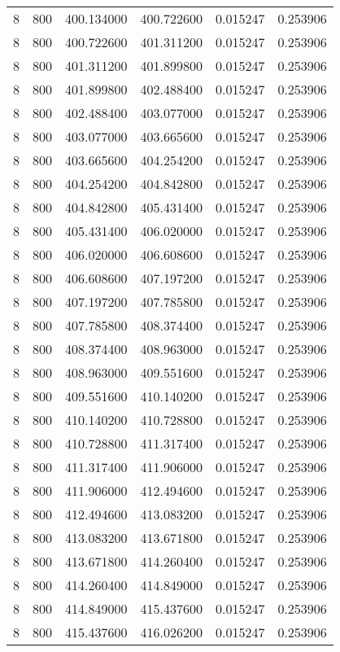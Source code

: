 \begin{longtable}{rrrrrr}
8 & 800 & 400.134000 & 400.722600 & 0.015247 & 0.253906 \\
8 & 800 & 400.722600 & 401.311200 & 0.015247 & 0.253906 \\
8 & 800 & 401.311200 & 401.899800 & 0.015247 & 0.253906 \\
8 & 800 & 401.899800 & 402.488400 & 0.015247 & 0.253906 \\
8 & 800 & 402.488400 & 403.077000 & 0.015247 & 0.253906 \\
8 & 800 & 403.077000 & 403.665600 & 0.015247 & 0.253906 \\
8 & 800 & 403.665600 & 404.254200 & 0.015247 & 0.253906 \\
8 & 800 & 404.254200 & 404.842800 & 0.015247 & 0.253906 \\
8 & 800 & 404.842800 & 405.431400 & 0.015247 & 0.253906 \\
8 & 800 & 405.431400 & 406.020000 & 0.015247 & 0.253906 \\
8 & 800 & 406.020000 & 406.608600 & 0.015247 & 0.253906 \\
8 & 800 & 406.608600 & 407.197200 & 0.015247 & 0.253906 \\
8 & 800 & 407.197200 & 407.785800 & 0.015247 & 0.253906 \\
8 & 800 & 407.785800 & 408.374400 & 0.015247 & 0.253906 \\
8 & 800 & 408.374400 & 408.963000 & 0.015247 & 0.253906 \\
8 & 800 & 408.963000 & 409.551600 & 0.015247 & 0.253906 \\
8 & 800 & 409.551600 & 410.140200 & 0.015247 & 0.253906 \\
8 & 800 & 410.140200 & 410.728800 & 0.015247 & 0.253906 \\
8 & 800 & 410.728800 & 411.317400 & 0.015247 & 0.253906 \\
8 & 800 & 411.317400 & 411.906000 & 0.015247 & 0.253906 \\
8 & 800 & 411.906000 & 412.494600 & 0.015247 & 0.253906 \\
8 & 800 & 412.494600 & 413.083200 & 0.015247 & 0.253906 \\
8 & 800 & 413.083200 & 413.671800 & 0.015247 & 0.253906 \\
8 & 800 & 413.671800 & 414.260400 & 0.015247 & 0.253906 \\
8 & 800 & 414.260400 & 414.849000 & 0.015247 & 0.253906 \\
8 & 800 & 414.849000 & 415.437600 & 0.015247 & 0.253906 \\
8 & 800 & 415.437600 & 416.026200 & 0.015247 & 0.253906 \\

\end{longtable}
